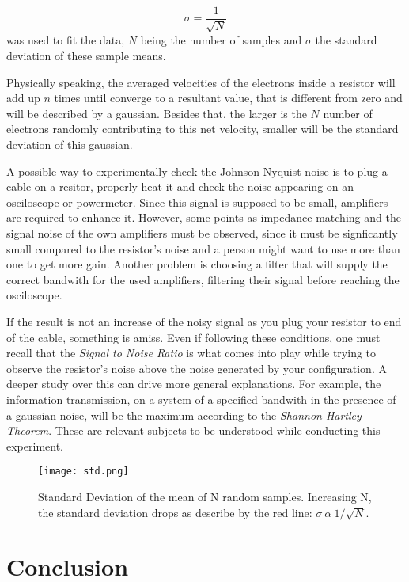 \documentclass{article}
\begin{document}
{\begin{equation}
\sigma = \frac{1}{\sqrt{N}}
\label{p}
\end{equation}
was used to fit the data, $N$ being the number of samples and $\sigma$
the standard deviation of these sample means. 

Physically speaking, the averaged
velocities of the electrons inside a resistor will add up $n$ times until
converge to a resultant value, that is different from
zero and will be described by a gaussian.  
Besides that, the larger is the $N$ number of electrons randomly
contributing to this net velocity, smaller will be the standard
deviation of this gaussian.    

A possible way to experimentally check the
Johnson-Nyquist noise is to plug a cable on a resitor, properly heat it
and check the noise appearing on an osciloscope or powermeter. 
Since this signal is supposed to be small, amplifiers are required to
enhance it. However, some points as impedance matching and the signal
noise of the own amplifiers must be observed, since it must be
signficantly small compared to the resistor's noise and a person might want
to use more than one to get more gain. Another problem is
choosing a filter that will supply the correct bandwith for the used
amplifiers, filtering their signal before reaching the osciloscope.

If the result is not an increase of the noisy signal as you plug your
resistor to end of the cable, something is amiss. Even if following
these conditions, one must recall that the \emph{Signal to Noise Ratio} is what
comes into play while trying to observe the resistor's noise above the
noise generated by your configuration. A deeper study over this can
drive more general explanations. For example, the information transmission, on
a system of a specified bandwith in the presence of a gaussian noise, 
will be the maximum according to the \emph{Shannon-Hartley
  Theorem}. These are relevant subjects to be understood while conducting this experiment.  

\begin{figure}[H]
\center
\texttt{[image: std.png]}
\caption {Standard Deviation of the mean of N random samples. Increasing
N, the standard deviation drops as describe by the red line: $\sigma \ \alpha
 \ 1/\sqrt{N}$.} 
\label{std}
\end{figure}

\section{Conclusion}

}
\end{document}
